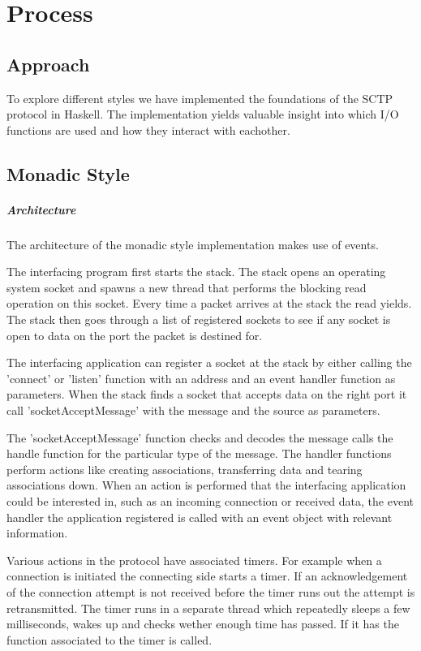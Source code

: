 \chapter{Process}
\section{Approach}
To explore different styles we have implemented the foundations of the SCTP protocol\cite{_rfc_????} in Haskell. The implementation yields valuable insight into which I/O functions are used and how they interact with eachother.
\section{Monadic Style}
\paragraph{Architecture}
The architecture of the monadic style implementation makes use of events.

The interfacing program first starts the stack. The stack opens an operating system socket and spawns a new thread that performs the blocking read operation on this socket. Every time a packet arrives at the stack the read yields. The stack then goes through a list of registered sockets to see if any socket is open to data on the port the packet is destined for.

The interfacing application can register a socket at the stack by either calling the 'connect' or 'listen' function with an address and an event handler function as parameters.
When the stack finds a socket that accepts data on the right port it call 'socketAcceptMessage' with the message and the source as parameters.

The 'socketAcceptMessage' function checks and decodes the message calls the handle function for the particular type of the message. The handler functions perform actions like creating associations, transferring data and tearing associations down. When an action is performed that the interfacing application could be interested in, such as an incoming connection or received data, the event handler the application registered is called with an event object with relevant information.

Various actions in the protocol have associated timers. For example when a connection is initiated the connecting side starts a timer. If an acknowledgement of the connection attempt is not received before the timer runs out the attempt is retransmitted. The timer runs in a separate thread which repeatedly sleeps a few milliseconds, wakes up and checks wether enough time has passed. If it has the function associated to the timer is called.

